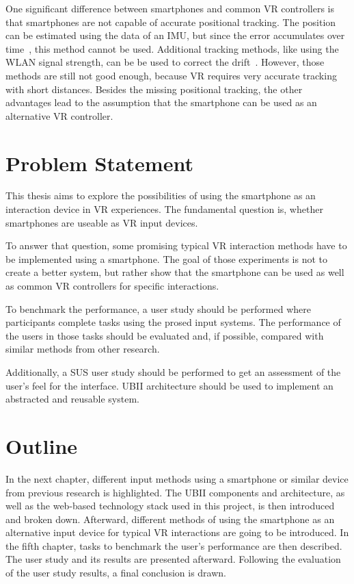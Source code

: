 One significant difference between smartphones and common \ac{VR} controllers is that smartphones are not capable of accurate positional tracking. The position can be estimated using the data of an \ac{IMU}, but since the error accumulates over time~\cite[44]{Steed.2013}, this method cannot be used. Additional tracking methods, like using the \ac{WLAN} signal strength, can be be used to correct the drift~\cite{Zhang.2015}. However, those methods are still not good enough, because \ac{VR} requires very accurate tracking with short distances.
Besides the missing positional tracking, the other advantages lead to the assumption that the smartphone can be used as an alternative \ac{VR} controller. 


\section{Problem Statement}\label{section:problem-statement}
This thesis aims to explore the possibilities of using the smartphone as an interaction device in \ac{VR} experiences. The fundamental question is, whether smartphones are useable as \ac{VR} input devices. 

To answer that question, some promising typical \ac{VR} interaction methods have to be implemented using a smartphone. The goal of those experiments is not to create a better system, but rather show that the smartphone can be used as well as common \ac{VR} controllers for specific interactions. 

To benchmark the performance, a user study should be performed where participants complete tasks using the prosed input systems.
The performance of the users in those tasks should be evaluated and, if possible, compared with similar methods from other research. 

Additionally, a \ac{SUS} user study should be performed to get an assessment of the user's feel for the interface.
\ac{UBII} architecture should be used to implement an abstracted and reusable system.


\section{Outline}\label{section:outline}
In the next chapter, different input methods using a smartphone or similar device from previous research is highlighted. The \ac{UBII} components and architecture, as well as the web-based technology stack used in this project, is then introduced and broken down. Afterward, different methods of using the smartphone as an alternative input device for typical \ac{VR} interactions are going to be introduced. In the fifth chapter, tasks to benchmark the user's performance are then described. The user study and its results are presented afterward. Following the evaluation of the user study results, a final conclusion is drawn.
